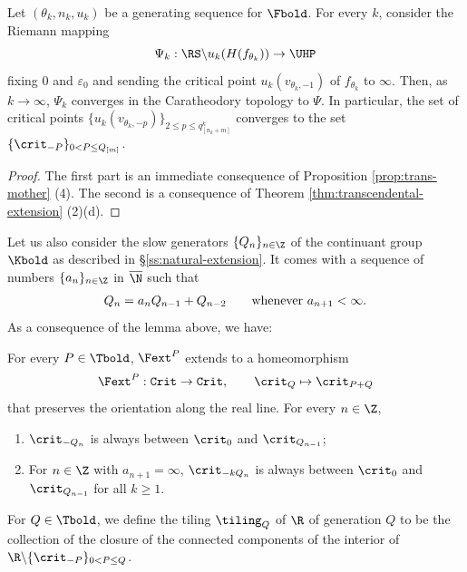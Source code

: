 \documentclass{amsart}
\begin{document}
\begin{lemma}
\label{lem:convergence-external}
    Let $(\theta_k,n_k, u_k)$ be a generating sequence for $\Fbold$.
    For every $k$, consider the Riemann mapping 
    \[
        \Psi_k: \RS \backslash u_k(H(f_{\theta_k})) \to \UHP
    \]
    fixing $0$ and $\varepsilon_0$ and sending the critical point $u_k(v_{\theta_k,-1})$ of $f_{\theta_k}$ to $\infty$.
    Then, as $k \to \infty$, $\Psi_k$ converges in the Caratheodory topology to $\Psi$.
    In particular, the set of critical points $\{u_k(v_{\theta_k,-p})\}_{2 \leq p \leq q^k_{[n_k+m]}}$ converges to the set $\{\crit_{-P}\}_{0<P\leq Q_{[m]}}$.
\end{lemma}

\begin{proof}
    The first part is an immediate consequence of Proposition \ref{prop:trans-mother} (4). The second is a consequence of Theorem \ref{thm:transcendental-extension} (2)(d).
\end{proof}

Let us also consider the slow generators $\{Q_n\}_{n\in\Z}$ of the continuant group $\Kbold$ as described in \S\ref{ss:natural-extension}.
It comes with a sequence of numbers $\{a_n\}_{n\in\Z}$ in $\overline{\N}$ such that 
\[
    Q_n = a_n Q_{n-1} + Q_{n-2} \qquad \textnormal{whenever } a_{n+1}<\infty.
\]
As a consequence of the lemma above, we have:

\begin{corollary}
\label{cor:extension-critical}
    For every $P \in \Tbold$, $\Fext^P$ extends to a homeomorphism
    \[
    \Fext^{P} : \mathtt{Crit} \to \mathtt{Crit}, \qquad \crit_Q \mapsto \crit_{P+Q}
    \]
    that preserves the orientation along the real line.
    For every $n \in \Z$,
\begin{enumerate}[label = \textnormal{(\roman*)}]
    \item $\crit_{-Q_n}$ is always between $\crit_0$ and $\crit_{Q_{n-1}}$;
    \item For $n \in \Z$ with $a_{n+1} = \infty$, $\crit_{-kQ_n}$ is always between $\crit_0$ and $\crit_{Q_{n-1}}$ for all $k \geq 1$.
\end{enumerate}
\end{corollary}

\begin{definition}
    For $Q \in \Tbold$, we define the tiling $\tiling_Q$ of $\R$ of generation $Q$ to be the collection of the closure of the connected components of the interior of $\R \backslash \{\crit_{-P}\}_{0 < P \leq Q}$.
\end{definition}
\end{document}

